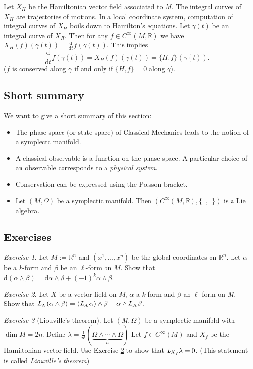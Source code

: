 \documentclass[12pt]{amsart}
\numberwithin{equation}{section}
\theoremstyle{plain}
\theoremstyle{definition}
\theoremstyle{remark}
\newtheorem{exe}{Exercise}[subsection]
\newcommand{\R}{\mathbb{R}}
\newcommand{\dd}{{\mathrm{d}}}
\begin{document}
Let $X_H$ be the Hamiltonian vector field associated to $M$. The integral curves of $X_H$ are trajectories of motions. In a local coordinate system, computation of integral curves of $X_H$ boils down to Hamilton's equations. Let $\gamma(t)$ be an integral curve of $X_H$. Then for any $f\in C^\infty(M,\R)$ we have $X_H(f)(\gamma(t))=\frac{\dd}{\dd t}f(\gamma(t))$. This implies 
\[
\frac{\dd}{\dd t}f(\gamma(t))=X_H(f)(\gamma(t))=\{H,f\}(\gamma(t)).
\]
($f$ is conserved along $\gamma$ if and only if $\{H,f\}=0$ along $\gamma$).


\subsection{Short summary}
We want to give a short summary of this section:
\begin{itemize}
\item{The phase space (or state space) of Classical Mechanics leads to the notion of a symplectc manifold.
}
\item{A classical observable is a function on the phase space. A particular choice of an observable corresponds to a \emph{physical system}.
}
\item{Conservation can be expressed using the Poisson bracket.
}
\item{Let $(M,\Omega)$ be a symplectic manifold. Then $(C^\infty(M,\R),\{\enspace,\enspace\})$ is a Lie algebra.
}
\end{itemize}


\subsection{Exercises}

\begin{exe}
Let $M:=\R^n$ and $(x^1,...,x^n)$ be the global coordinates on $\R^n$. Let $\alpha$ be a $k$-form and $\beta$ be an $\ell$-form on $M$. 
Show that $\dd(\alpha\land\beta)=\dd\alpha\land \beta+(-1)^k\alpha\land \beta$.
\end{exe}

\begin{exe}
\label{ex_mnf}
Let $X$ be a vector field on $M$, $\alpha$ a $k$-form and $\beta$ an $\ell$-form on $M$. Show that $\emph{L}_X(\alpha\land\beta)=(\emph{L}_X\alpha)\land \beta+\alpha\land\emph{L}_X\beta$.
\end{exe}

\begin{exe}[Liouville's theorem]
Let $(M,\Omega)$ be a symplectic manifold with $\dim M=2n$. Define $\lambda=\frac{1}{n!}(\underbrace{\Omega\land\dotsm\land\Omega}_{n})$ Let $f\in C^\infty(M)$ and $X_f$ be the Hamiltonian vector field. Use Exercise \ref{ex_mnf} to show that $\emph{L}_{X_f}\lambda=0$. (This statement is called \emph{Liouville's theorem})
\end{exe}
\end{document}
